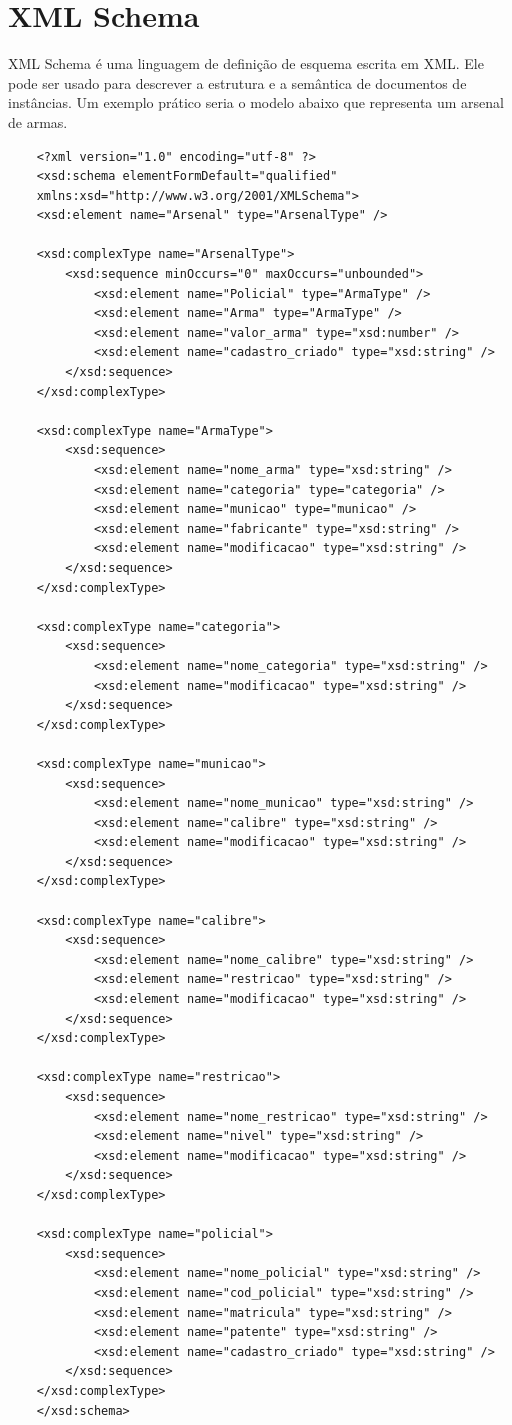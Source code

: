 \documentclass[12pt]{article}
\begin{document}
\section{XML Schema}
XML Schema é uma linguagem de definição de esquema escrita em XML. Ele pode ser usado para descrever a estrutura e a semântica de documentos de instâncias. Um exemplo prático seria o modelo abaixo que representa um arsenal de armas.
	\begin{verbatim}
	<?xml version="1.0" encoding="utf-8" ?>
	<xsd:schema elementFormDefault="qualified"
	xmlns:xsd="http://www.w3.org/2001/XMLSchema">
	<xsd:element name="Arsenal" type="ArsenalType" />
	
	<xsd:complexType name="ArsenalType">
		<xsd:sequence minOccurs="0" maxOccurs="unbounded">
			<xsd:element name="Policial" type="ArmaType" />
			<xsd:element name="Arma" type="ArmaType" />
			<xsd:element name="valor_arma" type="xsd:number" />
			<xsd:element name="cadastro_criado" type="xsd:string" />
		</xsd:sequence>
	</xsd:complexType>
	
	<xsd:complexType name="ArmaType">
		<xsd:sequence>
			<xsd:element name="nome_arma" type="xsd:string" />
			<xsd:element name="categoria" type="categoria" />
			<xsd:element name="municao" type="municao" />
			<xsd:element name="fabricante" type="xsd:string" />
			<xsd:element name="modificacao" type="xsd:string" />
		</xsd:sequence>
	</xsd:complexType>
	
	<xsd:complexType name="categoria">
		<xsd:sequence>
			<xsd:element name="nome_categoria" type="xsd:string" />
			<xsd:element name="modificacao" type="xsd:string" />
		</xsd:sequence>
	</xsd:complexType>
	
	<xsd:complexType name="municao">
		<xsd:sequence>
			<xsd:element name="nome_municao" type="xsd:string" />
			<xsd:element name="calibre" type="xsd:string" />
			<xsd:element name="modificacao" type="xsd:string" />
		</xsd:sequence>
	</xsd:complexType>
	
	<xsd:complexType name="calibre">
		<xsd:sequence>
			<xsd:element name="nome_calibre" type="xsd:string" />
			<xsd:element name="restricao" type="xsd:string" />
			<xsd:element name="modificacao" type="xsd:string" />
		</xsd:sequence>
	</xsd:complexType>
	
	<xsd:complexType name="restricao">
		<xsd:sequence>
			<xsd:element name="nome_restricao" type="xsd:string" />
			<xsd:element name="nivel" type="xsd:string" />
			<xsd:element name="modificacao" type="xsd:string" />
		</xsd:sequence>
	</xsd:complexType>
	
	<xsd:complexType name="policial">
		<xsd:sequence>
			<xsd:element name="nome_policial" type="xsd:string" />            
			<xsd:element name="cod_policial" type="xsd:string" />
			<xsd:element name="matricula" type="xsd:string" />
			<xsd:element name="patente" type="xsd:string" />
			<xsd:element name="cadastro_criado" type="xsd:string" />
		</xsd:sequence>
	</xsd:complexType>
	</xsd:schema>
	\end{verbatim}
	
\end{document}
